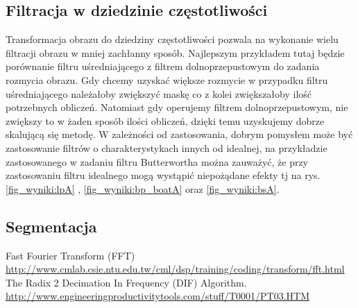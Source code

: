 \documentclass{classrep}
\begin{document}
\subsection{Filtracja w dziedzinie częstotliwości}

Transformacja obrazu do dziedziny częstotliwości pozwala na wykonanie wielu filtracji obrazu w mniej zachłanny sposób. Najlepszym przykładem tutaj będzie porównanie filtru uśredniającego z filtrem dolnoprzepustowym do zadania rozmycia obrazu. Gdy chcemy uzyskać większe rozmycie w przypadku filtru uśredniającego należałoby zwiększyć maskę co z kolei zwiększałoby ilość potrzebnych obliczeń. Natomiast gdy operujemy filtrem dolnoprzepustowym, nie zwiększy to w żaden sposób ilości obliczeń, dzięki temu uzyskujemy dobrze skalującą się metodę. W zależności od zastosowania, dobrym pomysłem może być zastosowanie filtrów o charakterystykach innych od idealnej, na przykładzie zastosowanego w zadaniu filtru Butterwortha można zauważyć, że przy zastosowaniu filtru idealnego mogą wystąpić niepożądane efekty tj na rys. \ref{fig_wyniki:lpA} , \ref{fig_wyniki:bp_boatA} oraz \ref{fig_wyniki:bsA}. 


\subsection{Segmentacja}



\begin{thebibliography}{8}

 Fast Fourier Transform (FFT) \url{http://www.cmlab.csie.ntu.edu.tw/cml/dsp/training/coding/transform/fft.html}
 The Radix 2 Decimation In Frequency (DIF) Algorithm.   \url{http://www.engineeringproductivitytools.com/stuff/T0001/PT03.HTM}

\end{thebibliography}
\end{document}
